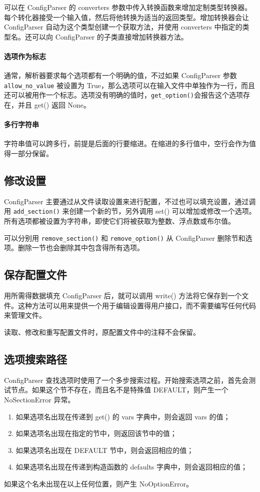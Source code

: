 可以在 ConfigParser 的 converters 参数中传入转换函数来增加定制类型转换器。每个转化器接受一个输入值，然后将他转换为适当的返回类型。增加转换器会让 ConfigParser 自动为这个类型创建一个获取方法，并使用 converters 中指定的类型名。还可以向 ConfigParser 的子类直接增加转换器方法。

\paragraph{选项作为标志} 通常，解析器要求每个选项都有一个明确的值，不过如果 ConfigParser 参数 \verb|allow_no_value| 被设置为 True，那么选项可以在输入文件中单独作为一行，而且还可以被用作一个标志。选项没有明确的值时，\verb|get_option()|会报告这个选项存在，并且 get() 返回 None。
\paragraph{多行字符串} 字符串值可以跨多行，前提是后面的行要缩进。在缩进的多行值中，空行会作为值得一部分保留。

\subsection{修改设置}
ConfigParser 主要通过从文件读取设置来进行配置，不过也可以填充设置，通过调用 \verb|add_section()| 来创建一个新的节，另外调用 set() 可以增加或修改一个选项。所有选项都被设置为字符串，即使它们将被获取为整数、浮点数或布尔值。

可以分别用 \verb|remove_section()| 和 \verb|remove_option()| 从 ConfigParser 删除节和选项。删除一节也会删除其中包含得所有选项。

\subsection{保存配置文件}
用所需得数据填充 ConfigParser 后，就可以调用 write() 方法将它保存到一个文件。这种方法可以用来提供一个用于编辑设置得用户接口，而不需要编写任何代码来管理文件。

\begin{tcolorbox}[title=警告]
    读取、修改和重写配置文件时，原配置文件中的注释不会保留。
\end{tcolorbox}

\subsection{选项搜索路径}
ConfigParser 查找选项时使用了一个多步搜索过程。开始搜索选项之前，首先会测试节点。如果这个节不存在，而且名不是特殊值 DEFAULT，则产生一个 NoSectionError 异常。
\begin{enumerate}
    \item 如果选项名出现在传递到 get() 的 vars 字典中，则会返回 vars 的值；
    \item 如果选项名出现在指定的节中，则返回该节中的值；
    \item 如果选项名出现在 DEFAULT 节中，则会返回相应的值；
    \item 如果选项名出现在传递到构造函数的 defaults 字典中，则会返回相应的值；
\end{enumerate}
如果这个名未出现在以上任何位置，则产生 NoOptionError。

